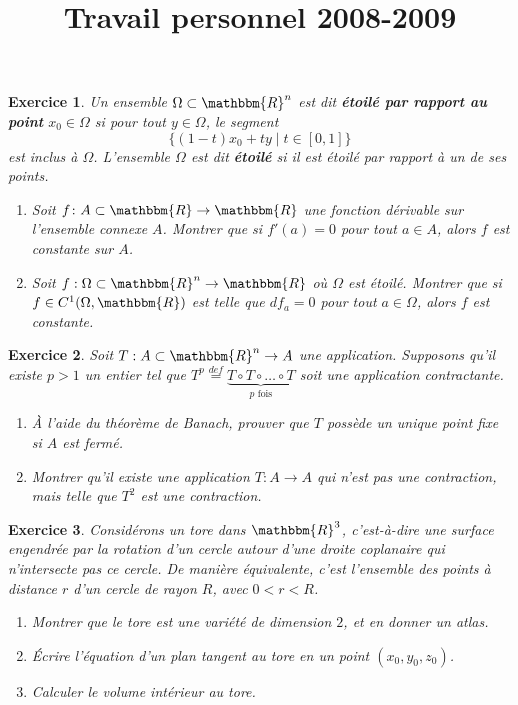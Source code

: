 \documentclass[a4paper,12pt]{article}
\theoremstyle{PourExo}\newtheorem{exercice}{Exercice}
\newcommand{\defe}[2]{ {\bf #1} }
\newcommand{\eR}{\mathbbm{R}}
\begin{document}
\title{Travail personnel 2008-2009}
\maketitle

\begin{exercice}

Un ensemble $\Omega\subset\eR^n$ est dit \defe{étoilé par rapport au point}{ensemble étoilé} $x_0\in\Omega$ si pour tout $y \in \Omega$, le segment
\begin{equation*}
	\{ (1-t) x_0 + t y \mid t \in  [0,1] \}
\end{equation*}
est inclus à $\Omega$. L'ensemble $\Omega$ est dit \defe{étoilé}{ensemble étoilé} si il est étoilé par rapport à un de ses points.

\begin{enumerate}
\item
Soit $f\colon A\subset \eR\to\eR$ une fonction dérivable sur l'ensemble connexe $A$. Montrer que si $f'(a)=0$ pour tout $a\in A$, alors $f$ est constante sur $A$.

\item
Soit $f : \Omega \subset \eR^n \to \eR$ où $\Omega$ est étoilé. Montrer que si $f \in C^1(\Omega,{\eR})$ est telle que $df_a = 0$ pour tout $a \in \Omega$, alors $f$ est constante.

\end{enumerate}
\end{exercice}

\begin{exercice}
Soit $T : A \subset {\eR}^n \to A$ une application. Supposons qu'il existe $p > 1$ un entier tel que $T^p \stackrel{def}{=} \underbrace{T \circ T \circ \ldots \circ T}_{\text{$p$ fois}}$ soit une application contractante.

\begin{enumerate}
\item
À l'aide du théorème de Banach, prouver que $T$ possède un unique point fixe si $A$ est fermé.
\item
Montrer qu'il existe une application $T : A \to A$ qui n'est pas une contraction, mais telle que $T^2$ est une contraction.
\end{enumerate}
\end{exercice}

\begin{exercice}
Considérons un tore dans ${\eR}^3$, c'est-à-dire une surface engendrée par la rotation d'un cercle autour d'une droite coplanaire qui n'intersecte pas ce cercle. De manière équivalente, c'est l'ensemble des points à distance $r$ d'un cercle de rayon $R$, avec $0 < r < R$.
\begin{enumerate}
\item
Montrer que le tore est une variété de dimension $2$, et en donner un atlas.
\item
Écrire l'équation d'un plan tangent au tore en un point $(x_0, y_0, z_0)$.
\item
Calculer le volume intérieur au tore.
\end{enumerate}
\end{exercice}
\end{document}
